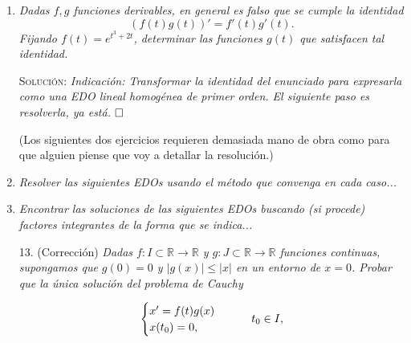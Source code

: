 \documentclass{article}
\begin{document}
\begin{enumerate}
\begin{enumerate}
        \vspace{7px}

        \textsc{Solución}: Me temo que no. A modo de contraejemplo, basta estudiar el caso de la igualdad $a(t) = 1/t$. La mano de obra recae sobre tus hombros. $\hfill\square$
    \end{enumerate}

    \vspace{12px}

    \item \textit{Dadas $f, g$ funciones derivables, en general es falso que se cumple la identidad \[(f(t)g(t))' = f'(t)g'(t).\] Fijando $f(t) = e^{t^3 + 2t}$, determinar las funciones $g(t)$ que satisfacen tal identidad.}

    \vspace{7px}

    \textsc{Solución}: \textit{Indicación: Transformar la identidad del enunciado para expresarla como una EDO lineal homogénea de primer orden. El siguiente paso es resolverla, ya está.} $\hfill\square$

    \begin{center}
        {(Los siguientes dos ejercicios requieren demasiada mano de obra como para que alguien piense que voy a detallar la resolución.)}
    \end{center}

    \item \textit{Resolver las siguientes EDOs usando el método que convenga en cada caso...}

    \vspace{12px}

    \item \textit{Encontrar las soluciones de las siguientes EDOs buscando (si procede) factores integrantes de la forma que se indica...}

    \vspace{7px}

    \item[13.] (Corrección) \textit{Dadas $f : I \subset \mathbb{R} \rightarrow \mathbb{R}$ y $g : J \subset \mathbb{R} \rightarrow \mathbb{R}$ funciones continuas, supongamos que $g(0) = 0$ y $|g(x)| \leq |x|$ en un entorno de $x = 0$. Probar que la única solución del problema de Cauchy}
    
    \[
    \begin{cases}
        x' = f(t)g(x) \\
        x(t_0) = 0,
    \end{cases}
    \hspace{20px}
    t_0 \in I,
    \]


\end{enumerate}
\end{document}
